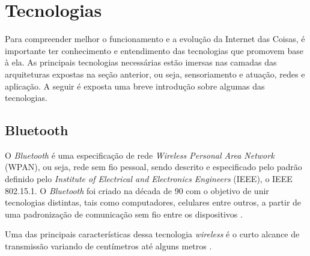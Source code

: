 

\section{Tecnologias}


Para compreender melhor o funcionamento e a evolução da Internet das Coisas, é importante ter conhecimento e entendimento das tecnologias que promovem base à ela. As principais tecnologias necessárias estão imersas nas camadas das arquiteturas expostas na seção anterior, ou seja, sensoriamento e atuação, redes e aplicação. A seguir é exposta uma breve introdução sobre algumas das tecnologias.

\subsection{Bluetooth}

O \textit{Bluetooth} é uma especificação de rede  \textit{Wireless Personal Area Network} (WPAN), ou seja, rede sem fio pessoal, sendo descrito e especificado pelo padrão definido pelo \textit{{Institute of Electrical and Electronics Engineers}} (IEEE), o IEEE 802.15.1. O \textit{Bluetooth} foi criado na década de 90 com o objetivo de unir tecnologias distintas, tais como computadores, celulares entre outros, a partir de uma padronização de comunicação sem fio entre os dispositivos \cite{Kardach2008}. 




Uma das principais características dessa tecnologia \textit{wireless} é o curto alcance de transmissão variando de centímetros até alguns metros \cite{Huang2007}. 

